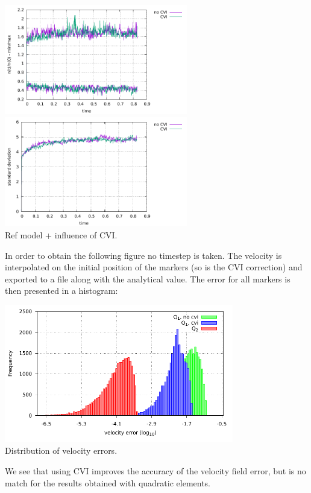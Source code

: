 \begin{center}
\includegraphics[width=8cm]{python_codes/fieldstone_30/results_streamline/markercount_cvi}
\includegraphics[width=8cm]{python_codes/fieldstone_30/results_streamline/stdev_cvi}\\
{\captionfont Ref model + influence of CVI.}
\end{center}


In order to obtain the following figure no timestep is taken. The velocity is interpolated on 
the initial position of the markers (so is the CVI correction) and exported to a file along with 
the analytical value. The error for all markers is then presented in a histogram:
\begin{center}
\includegraphics[width=10cm]{python_codes/fieldstone_30/results_streamline/errors/histogram}\\
{\captionfont Distribution of velocity errors.}
\end{center}
We see that using CVI improves the accuracy of the velocity field error, but is no match for 
the results obtained with quadratic elements.

